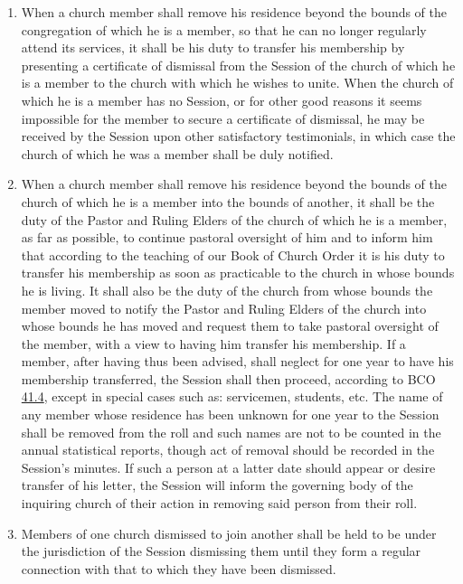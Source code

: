 \documentclass[
]{book}
\providecommand{\tightlist}{%
  \setlength{\itemsep}{0pt}\setlength{\parskip}{0pt}}
\begin{document}
\protect\hypertarget{chapter-slug-49-jurisdiction}{\href{}{}}

\begin{enumerate}
\def\labelenumi{\arabic{enumi}.}
\tightlist
\item
  \protect\hypertarget{49}{\href{}{}}When a church member shall remove his residence beyond the bounds of the congregation of which he is a member, so that he can no longer regularly attend its services, it shall be his duty to transfer his membership by presenting a certificate of dismissal from the Session of the church of which he is a member to the church with which he wishes to unite. When the church of which he is a member has no Session, or for other good reasons it seems impossible for the member to secure a certificate of dismissal, he may be received by the Session upon other satisfactory testimonials, in which case the church of which he was a member shall be duly notified.
\item
  When a church member shall remove his residence beyond the bounds of the church of which he is a member into the bounds of another, it shall be the duty of the Pastor and Ruling Elders of the church of which he is a member, as far as possible, to continue pastoral oversight of him and to inform him that according to the teaching of our Book of Church Order it is his duty to transfer his membership as soon as practicable to the church in whose bounds he is living. It shall also be the duty of the church from whose bounds the member moved to notify the Pastor and Ruling Elders of the church into whose bounds he has moved and request them to take pastoral oversight of the member, with a view to having him transfer his membership. If a member, after having thus been advised, shall neglect for one year to have his membership transferred, the Session shall then proceed, according to BCO \protect\hyperlink{41.4}{41.4}, except in special cases such as: servicemen, students, etc. The name of any member whose residence has been unknown for one year to the Session shall be removed from the roll and such names are not to be counted in the annual statistical reports, though act of removal should be recorded in the Session's minutes. If such a person at a latter date should appear or desire transfer of his letter, the Session will inform the governing body of the inquiring church of their action in removing said person from their roll.
\item
  Members of one church dismissed to join another shall be held to be under the jurisdiction of the Session dismissing them until they form a regular connection with that to which they have been dismissed.

\end{enumerate}
\end{document}
